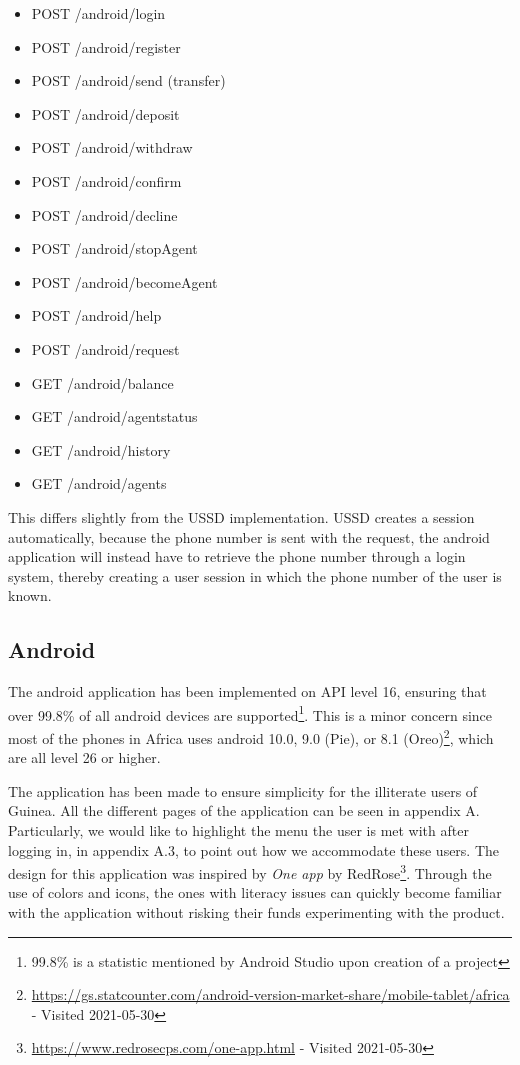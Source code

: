 \documentclass[11pt, a4paper]{article}
\begin{document}
\begin{itemize}
  \item POST /android/login
  \item POST /android/register
  \item POST /android/send (transfer)
  \item POST /android/deposit
  \item POST /android/withdraw
  \item POST /android/confirm
  \item POST /android/decline
  \item POST /android/stopAgent
  \item POST /android/becomeAgent
  \item POST /android/help
  \item POST /android/request
  \item GET /android/balance
  \item GET /android/agentstatus
  \item GET /android/history
  \item GET /android/agents
\end{itemize}

This differs slightly from the USSD implementation. USSD creates a session automatically, because the phone number is sent with the request, the android application will instead have to retrieve the phone number through a login system, thereby creating a user session in which the phone number of the user is known.

\subsection{Android}
The android application has been implemented on API level 16, ensuring that over 99.8\% of all android devices are supported\footnote{99.8\% is a statistic mentioned by Android Studio upon creation of a project}. This is a minor concern since most of the phones in Africa uses android 10.0, 9.0 (Pie), or 8.1 (Oreo)\footnote{\url{https://gs.statcounter.com/android-version-market-share/mobile-tablet/africa} - Visited 2021-05-30}, which are all level 26 or higher.

The application has been made to ensure simplicity for the illiterate users of Guinea. All the different pages of the application can be seen in appendix A. Particularly, we would like to highlight the menu the user is met with after logging in, in appendix A.3, to point out how we accommodate these users. The design for this application was inspired by \textit{One app} by RedRose\footnote{\url{https://www.redrosecps.com/one-app.html} - Visited 2021-05-30}. Through the use of colors and icons, the ones with literacy issues can quickly become familiar with the application without risking their funds experimenting with the product.
\end{document}

